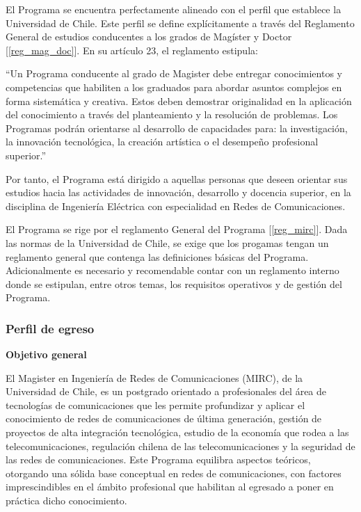 El Programa se encuentra perfectamente alineado con el perfil que establece la Universidad de
Chile. Este perfil se define explícitamente a través del Reglamento General de estudios conducentes
a los grados de Magíster y Doctor [\ref{reg_mag_doc}]. En su artículo 23, el reglamento estipula:

``Un Programa conducente al grado de Magister debe entregar conocimientos y competencias que
habiliten a los graduados para abordar asuntos complejos en forma sistemática y creativa. Estos
deben demostrar originalidad en la aplicación del conocimiento a través del planteamiento y la
resolución de problemas. Los Programas podrán orientarse al desarrollo de capacidades para: la
investigación, la innovación tecnológica, la creación artística o el desempeño profesional
superior.''

Por tanto, el Programa está dirigido a aquellas personas que deseen orientar sus estudios hacia
las actividades de innovación, desarrollo y docencia superior, en la disciplina de
Ingeniería Eléctrica con especialidad en Redes de Comunicaciones.

El Programa se rige por el reglamento General del Programa [\ref{reg_mirc}]. 
Dada las normas de la Universidad de Chile, se exige que los progamas tengan
un reglamento general que contenga las definiciones básicas del Programa. Adicionalmente es
necesario y recomendable contar con un reglamento interno donde se estipulan, entre otros temas,
los requisitos operativos y de gestión del Programa.

\subsubsection{Perfil de egreso}

\noindent\textbf{Objetivo general}

El Magister en Ingeniería de Redes de Comunicaciones (MIRC), de la Universidad de Chile, 
es un postgrado orientado a profesionales del área de tecnologías de comunicaciones que 
les permite profundizar y aplicar el conocimiento de redes de comunicaciones de última 
generación, gestión de proyectos de alta integración tecnológica, estudio de la economía 
que rodea a las telecomunicaciones, regulación chilena de las telecomunicaciones y la 
seguridad de las redes de comunicaciones. Este Programa equilibra aspectos teóricos, 
otorgando una sólida base conceptual en redes de comunicaciones, con factores imprescindibles 
en el ámbito profesional que habilitan al egresado a poner en práctica dicho conocimiento.

